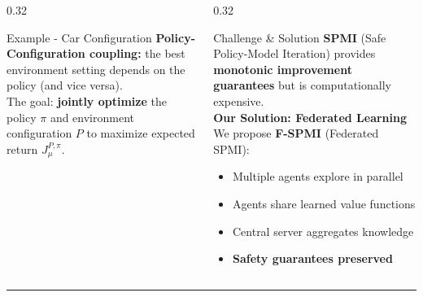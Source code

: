 \documentclass[final,t]{beamer}
\begin{document}
\begin{frame}[t]
\begin{columns}[T]
\begin{column}{0.32\textwidth}
\begin{block}{Example - Car Configuration}
\textbf{Policy-Configuration coupling:} the best environment setting depends on the policy (and vice versa).\\[0.3cm]


The goal: \textbf{jointly optimize} the policy $\pi$ and environment configuration $P$ to maximize expected return $J_\mu^{P,\pi}$.
\end{block}
\end{column}

\begin{column}{0.32\textwidth}
\begin{block}{Challenge \& Solution}
\textbf{SPMI} (Safe Policy-Model Iteration) provides \textbf{monotonic improvement guarantees} but is computationally expensive.\\[0.3cm]
\textbf{Our Solution: Federated Learning}\\[0.3cm]
We propose \textbf{F-SPMI} (Federated SPMI):
\begin{itemize}
    \item Multiple agents explore in parallel
    \item Agents share learned value functions
    \item Central server aggregates knowledge
    \item \textbf{Safety guarantees preserved}
\end{itemize}
\end{block}
\end{column}

\end{columns}

\vspace{0.3cm}
\begin{center}
\setlength{\fboxsep}{12pt}
\end{center}
\vspace{0.4cm}

\textcolor{rowsep}{\rule{\textwidth}{2pt}}
\vspace{0.3cm}

\begin{columns}[T]


\end{columns}
\end{frame}
\end{document}
